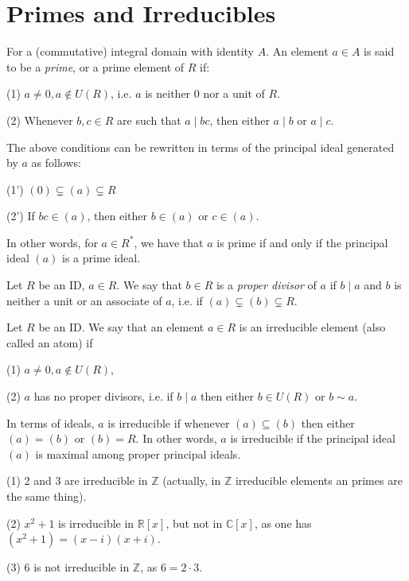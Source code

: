 \section{Primes and Irreducibles}
\begin{definition}[Prime]
    For a (commutative) integral domain with identity $A$. An element $a \in A$ is said to be a {\it prime}, or a prime element of $R$ if:

    (1) $a \neq 0, a \notin U(R)$, i.e. $a$ is neither 0 nor a unit of $R$.
    
    (2) Whenever $b, c \in R$ are such that $a \mid b c$, then either $a \mid b$ or $a \mid c$.
    
    The above conditions can be rewritten in terms of the principal ideal generated by $a$ as follows:
    
    (1') $(0) \subsetneq(a) \subsetneq R$
    
    (2') If $b c \in(a)$, then either $b \in(a)$ or $c \in(a)$.
\end{definition}

In other words, for $a \in R^{*}$, we have that $a$ is prime if and only if the principal ideal $(a)$ is a prime ideal.

\begin{definition}
     Let $R$ be an ID, $a \in R$. We say that $b \in R$ is a {\it proper divisor} of $a$ if $b \mid a$ and $b$ is neither a unit or an associate of $a$, i.e. if $(a) \subsetneq(b) \subsetneq R$.
\end{definition} 

\begin{definition}
    Let $R$ be an ID. We say that an element $a \in R$ is an irreducible element (also called an atom) if

    (1) $a \neq 0, a \notin U(R)$,
    
    (2) $a$ has no proper divisors, i.e. if $b \mid a$ then either $b \in U(R)$ or $b \sim a$.
\end{definition}
In terms of ideals, $a$ is irreducible if whenever $(a) \subseteq(b)$ then either $(a)=(b)$ or $(b)=R$. In other words, $a$ is irreducible if the principal ideal $(a)$ is maximal among proper principal ideals.

\begin{example}
    (1) 2 and 3 are irreducible in $\mathbb{Z}$ (actually, in $\mathbb{Z}$ irreducible elements an primes are the same thing).

    (2) $x^{2}+1$ is irreducible in $\mathbb{R}[x]$, but not in $\mathbb{C}[x]$, as one has $\left(x^{2}+1\right)=(x-i)(x+i)$.
    
    (3) 6 is not irreducible in $\mathbb{Z}$, as $6=2 \cdot 3$.
\end{example}

